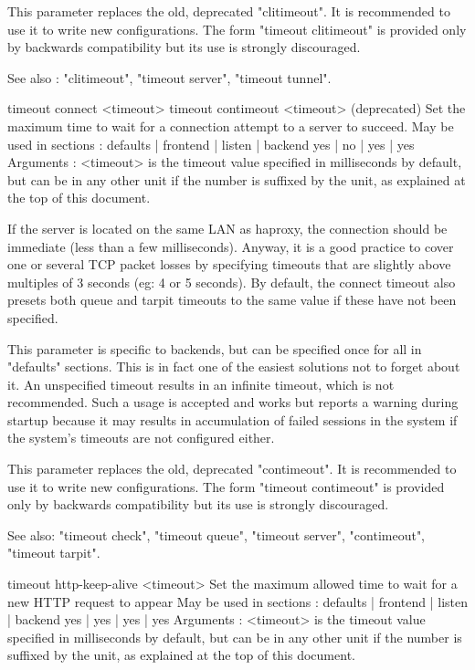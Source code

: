   This parameter replaces the old, deprecated "clitimeout". It is recommended
  to use it to write new configurations. The form "timeout clitimeout" is
  provided only by backwards compatibility but its use is strongly discouraged.

  See also : "clitimeout", "timeout server", "timeout tunnel".


timeout connect <timeout>
timeout contimeout <timeout> (deprecated)
  Set the maximum time to wait for a connection attempt to a server to succeed.
  May be used in sections :   defaults | frontend | listen | backend
                                 yes   |    no    |   yes  |   yes
  Arguments :
    <timeout> is the timeout value specified in milliseconds by default, but
              can be in any other unit if the number is suffixed by the unit,
              as explained at the top of this document.

  If the server is located on the same LAN as haproxy, the connection should be
  immediate (less than a few milliseconds). Anyway, it is a good practice to
  cover one or several TCP packet losses by specifying timeouts that are
  slightly above multiples of 3 seconds (eg: 4 or 5 seconds). By default, the
  connect timeout also presets both queue and tarpit timeouts to the same value
  if these have not been specified.

  This parameter is specific to backends, but can be specified once for all in
  "defaults" sections. This is in fact one of the easiest solutions not to
  forget about it. An unspecified timeout results in an infinite timeout, which
  is not recommended. Such a usage is accepted and works but reports a warning
  during startup because it may results in accumulation of failed sessions in
  the system if the system's timeouts are not configured either.

  This parameter replaces the old, deprecated "contimeout". It is recommended
  to use it to write new configurations. The form "timeout contimeout" is
  provided only by backwards compatibility but its use is strongly discouraged.

  See also: "timeout check", "timeout queue", "timeout server", "contimeout",
            "timeout tarpit".


timeout http-keep-alive <timeout>
  Set the maximum allowed time to wait for a new HTTP request to appear
  May be used in sections :   defaults | frontend | listen | backend
                                 yes   |    yes   |   yes  |   yes
  Arguments :
    <timeout> is the timeout value specified in milliseconds by default, but
              can be in any other unit if the number is suffixed by the unit,
              as explained at the top of this document.

